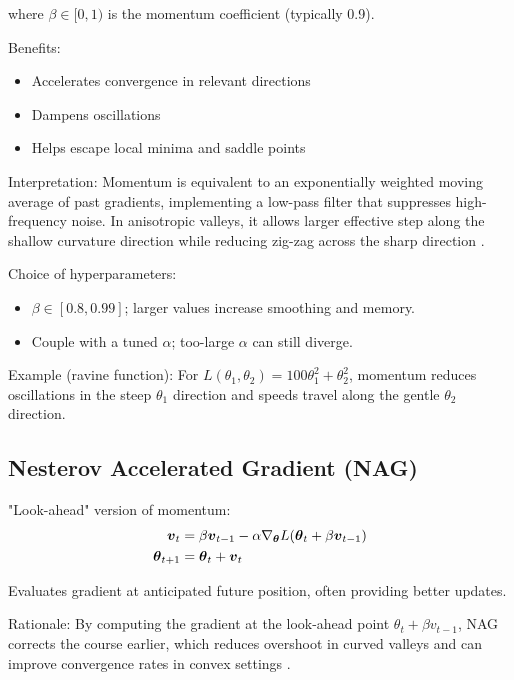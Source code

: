 where $\beta \in [0, 1)$ is the momentum coefficient (typically 0.9).

Benefits:
\begin{itemize}
    \item Accelerates convergence in relevant directions
    \item Dampens oscillations
    \item Helps escape local minima and saddle points
\end{itemize}

Interpretation: Momentum is equivalent to an exponentially weighted moving average of past gradients, implementing a low-pass filter that suppresses high-frequency noise. In anisotropic valleys, it allows larger effective step along the shallow curvature direction while reducing zig-zag across the sharp direction \cite{Polyak1964,WebOptimizationDLBook,D2LChapterOptimization}.

Choice of hyperparameters:
\begin{itemize}
    \item \(\beta\in[0.8,0.99]\); larger values increase smoothing and memory.
    \item Couple with a tuned \(\alpha\); too-large \(\alpha\) can still diverge.
\end{itemize}

Example (ravine function): For \(L(\theta_1,\theta_2)=100\theta_1^2+\theta_2^2\), momentum reduces oscillations in the steep \(\theta_1\) direction and speeds travel along the gentle \(\theta_2\) direction.

\subsection{Nesterov Accelerated Gradient (NAG)}

"Look-ahead" version of momentum:
\begin{align}
\boldsymbol{v}_t &= \beta \boldsymbol{v}_{t-1} - \alpha \nabla_{\boldsymbol{\theta}} L(\boldsymbol{\theta}_t + \beta \boldsymbol{v}_{t-1}) \\
\boldsymbol{\theta}_{t+1} &= \boldsymbol{\theta}_t + \boldsymbol{v}_t
\end{align}

Evaluates gradient at anticipated future position, often providing better updates.

Rationale: By computing the gradient at the look-ahead point \(\theta_t+\beta v_{t-1}\), NAG corrects the course earlier, which reduces overshoot in curved valleys and can improve convergence rates in convex settings \cite{Nesterov1983,WebOptimizationDLBook,GoodfellowEtAl2016}.

